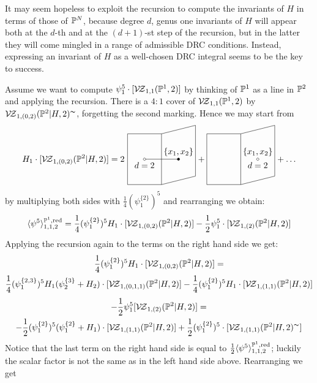 It may seem hopeless to exploit the recursion to compute the invariants of $H$ in terms of those of $\mathbb P^N$, because degree $d$, genus one invariants of $H$ will appear both at the $d$-th and at the $(d+1)$-st step of the recursion, but in the latter they will come mingled in a range of admissible DRC conditions. Instead, expressing an invariant of $H$ as a well-chosen DRC integral seems to be the key to success.
\begin{ex}
 Assume we want to compute $\psi_1^5\cdot[\mathcal{V\!Z}_{1,1}(\mathbb P^1,2)]$ by thinking of $\mathbb P^1$ as a line in $\mathbb P^2$ and applying the recursion. There is a $4:1$ cover of $\mathcal{V\!Z}_{1,1}(\mathbb P^1,2)$ by $\mathcal{V\!Z}_{1,(0,2)}(\mathbb P^2|H,2)^\thicksim$, forgetting the second marking. Hence we may start from
 \[
 H_1\cdot[\VZ{(0,2)}{\PP^2|H}{2}]=
 2\ {\tikz[baseline=-3pt,scale=.7]{
\draw (2,0) node[above]{$\{x_1,x_2\}$} -- (0,0)node[below]{$d=2$};
\draw (2,0) circle(2pt)[fill=black];
\draw (0,0) circle(2pt)[fill=white];
\draw (-1,1.5) -- (1,1.5) -- (1,-1.5) -- (-1,-1.5) -- (-1,1.5);
\draw (1,1.5) -- (3,2) -- (3,-1) -- (1,-1.5);
}}+
{\tikz[baseline=-3pt,scale=.7]{
\draw (2,0) node[above]{$\{x_1,x_2\}$} node[below]{$d=2$};
\draw (2,0) circle(2pt)[fill=white];
\draw (-1,1.5) -- (1,1.5) -- (1,-1.5) -- (-1,-1.5) -- (-1,1.5);
\draw (1,1.5) -- (3,2) -- (3,-1) -- (1,-1.5);
}}+\ldots
 \]
by multiplying both sides with $\frac{1}{4}(\psi_1^{\{2\}})^5$ and rearranging we obtain:
\[\langle \psi^5\rangle^{\mathbb P^1,\rm{red}}_{1,1,2}=\frac{1}{4}(\psi_1^{\{2\}})^5H_1\cdot[\mathcal{V\!Z}_{1,(0,2)}(\mathbb P^2|H,2)]-\frac{1}{2}\psi_1^5\cdot[\mathcal{V\!Z}_{1,(2)}(\mathbb P^2|H,2)]\]
 Applying the recursion again to the terms on the right hand side we get:
 \begin{multline*}\frac{1}{4}(\psi_1^{\{2\}})^5H_1\cdot[\mathcal{V\!Z}_{1,(0,2)}(\mathbb P^2|H,2)]=\\ \frac{1}{4}(\psi_1^{\{2,3\}})^5H_1(\psi_2^{\{3\}}+H_2)\cdot[\mathcal{V\!Z}_{1,(0,1,1)}(\mathbb P^2|H,2)] -\frac{1}{4}(\psi_1^{\{2\}})^5H_1\cdot[\mathcal{V\!Z}_{1,(1,1)}(\mathbb P^2|H,2)]\end{multline*}
 \begin{multline*}-\frac{1}{2}\psi_1^5[\mathcal{V\!Z}_{1,(2)}(\mathbb P^2|H,2)]=\\ -\frac{1}{2}(\psi_1^{\{2\}})^5(\psi_1^{\{2\}}+H_1)\cdot[\mathcal{V\!Z}_{1,(1,1)}(\mathbb P^2|H,2)]+\frac{1}{2}(\psi_1^{\{2\}})^5\cdot[\mathcal{V\!Z}_{1,(1,1)}(\mathbb P^2|H,2)^\thicksim]\end{multline*}
 Notice that the last term on the right hand side is equal to $\frac{1}{2}\langle \psi^5\rangle^{\mathbb P^1,\rm{red}}_{1,1,2}$; luckily the scalar factor is not the same as in the left hand side above. Rearranging we get
 \begin{multline*}

\end{multline*}
\end{ex}
